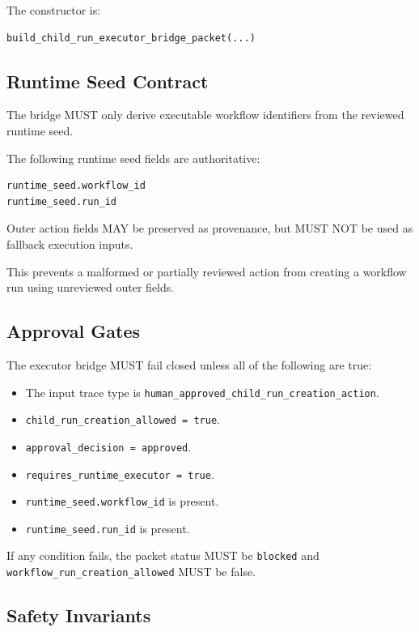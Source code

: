 The constructor is:

\begin{verbatim}
build_child_run_executor_bridge_packet(...)
\end{verbatim}

\subsection{Runtime Seed Contract}

The bridge MUST only derive executable workflow identifiers from the reviewed runtime seed.

The following runtime seed fields are authoritative:

\begin{verbatim}
runtime_seed.workflow_id
runtime_seed.run_id
\end{verbatim}

Outer action fields MAY be preserved as provenance, but MUST NOT be used as fallback execution inputs.

This prevents a malformed or partially reviewed action from creating a workflow run using unreviewed outer fields.

\subsection{Approval Gates}

The executor bridge MUST fail closed unless all of the following are true:

\begin{itemize}
  \item The input trace type is \texttt{human_approved_child_run_creation_action}.
  \item \texttt{child_run_creation_allowed = true}.
  \item \texttt{approval_decision = approved}.
  \item \texttt{requires_runtime_executor = true}.
  \item \texttt{runtime_seed.workflow_id} is present.
  \item \texttt{runtime_seed.run_id} is present.
\end{itemize}

If any condition fails, the packet status MUST be \texttt{blocked} and \texttt{workflow_run_creation_allowed} MUST be false.

\subsection{Safety Invariants}

